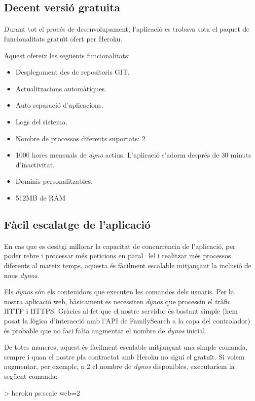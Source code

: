     \subsection{Decent versió gratuita}

    \paragraph{}
    Durant tot el procés de desenvolupament, l'aplicació es trobava sota el paquet de funcionalitats gratuït ofert per Heroku.

    Aquest ofereix les següents funcionalitats:

    \begin{itemize}
        \item Desplegament des de repositoris GIT.
        \item Actualitzacions automàtiques.
        \item Auto reparació d'aplicacions.
        \item Logs del sistema.
        \item Nombre de processos diferents suportats: 2
        \item 1000 hores mensuals de \emph{dyno} actius. L'aplicació s'adorm després de 30 minuts d'inactivitat.
        \item Dominis personalitzables.
        \item 512MB de RAM
    \end{itemize}


    \subsection{Fàcil escalatge de l'aplicació}

    \paragraph{}
    En cas que es desitgi millorar la capacitat de concurrència de l'aplicació, per poder rebre i processar més peticions en paral·lel i realitzar més processos diferents al mateix temps, aquesta és fàcilment escalable mitjançant la inclusió de nous \emph{dynos}.

    Els \emph{dynos} són els contenidors que executen les comandes dels usuaris. Per la nostra aplicació web, bàsicament es necessiten \emph{dynos} que processin el tràfic HTTP i HTTPS. Gràcies al fet que el nostre servidor és bastant simple (hem posat la lògica d'interacció amb l'API de FamilySearch a la capa del controlador) és probable que no faci falta augmentar el nombre de \emph{dynos} inicial.

    De totes maneres, aquest és fàcilment escalable mitjançant una simple comanda, sempre i quan el nostre pla contractat amb Heroku no sigui el gratuït. Si volem augmentar, per exemple, a 2 el nombre de \emph{dynos} disponibles, executaríem la següent comanda:

    \begin{displayquote}
        > heroku ps:scale web=2
    \end{displayquote}
